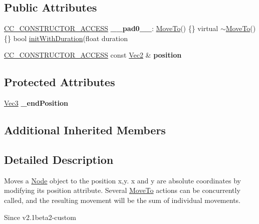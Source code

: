 \subsection*{Public Attributes}
\begin{DoxyCompactItemize}
\item 
\mbox{\label{classMoveTo_a72e173e12b53ac786033a4cce0dbebe1}} 
\hyperlink{_2cocos2d_2cocos_2base_2ccConfig_8h_a25ef1314f97c35a2ed3d029b0ead6da0}{C\+C\+\_\+\+C\+O\+N\+S\+T\+R\+U\+C\+T\+O\+R\+\_\+\+A\+C\+C\+E\+SS} {\bfseries \+\_\+\+\_\+pad0\+\_\+\+\_\+}\+: \hyperlink{classMoveTo}{Move\+To}() \{\} virtual $\sim$\hyperlink{classMoveTo}{Move\+To}() \{\} bool \hyperlink{classMoveTo_acc1190010eef055d34d62e37ac242043}{init\+With\+Duration}(float duration
\item 
\mbox{\label{classMoveTo_a70bc69decd681618b68197d9058148c7}} 
\hyperlink{_2cocos2d_2cocos_2base_2ccConfig_8h_a25ef1314f97c35a2ed3d029b0ead6da0}{C\+C\+\_\+\+C\+O\+N\+S\+T\+R\+U\+C\+T\+O\+R\+\_\+\+A\+C\+C\+E\+SS} const \hyperlink{classVec2}{Vec2} \& {\bfseries position}
\end{DoxyCompactItemize}
\subsection*{Protected Attributes}
\begin{DoxyCompactItemize}
\item 
\mbox{\label{classMoveTo_aef038affa10a6af477dd0201ebe5e975}} 
\hyperlink{classVec3}{Vec3} {\bfseries \+\_\+end\+Position}
\end{DoxyCompactItemize}
\subsection*{Additional Inherited Members}


\subsection{Detailed Description}
Moves a \hyperlink{classNode}{Node} object to the position x,y. x and y are absolute coordinates by modifying it\textquotesingle{}s position attribute. Several \hyperlink{classMoveTo}{Move\+To} actions can be concurrently called, and the resulting movement will be the sum of individual movements. 

\begin{DoxySince}{Since}
v2.\+1beta2-\/custom 
\end{DoxySince}


